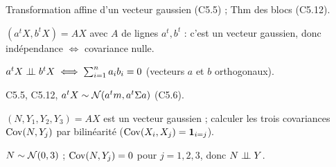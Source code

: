 \documentclass[11pt,a4paper]{article}
\begin{document}
\begin{exo}
\outils Transformation affine d'un vecteur gaussien (C5.5) ; Thm des blocs (C5.12).

\meth $(a^tX,b^tX)=AX$ avec $A$ de lignes $a^t,b^t$ : c'est un vecteur gaussien, donc indépendance $\iff$ covariance nulle.

\rep $a^tX\perp\!\!\!\perp b^tX\iff\sum_{i=1}^na_ib_i=0$ (vecteurs $a$ et $b$ orthogonaux).
\end{exo}

\begin{exo}[$N$ indépendant de $Y$]
\outils C5.5, C5.12, $a^tX\sim\mathcal{N}(a^tm,a^t\Sigma a)$ (C5.6).

\meth $(N,Y_1,Y_2,Y_3)=AX$ est un vecteur gaussien ; calculer les trois covariances $\operatorname{Cov}(N,Y_j)$ par bilinéarité
($\operatorname{Cov}(X_i,X_j)=\mathbf{1}_{i=j}$).

\rep $N\sim\mathcal{N}(0,3)$ ; $\operatorname{Cov}(N,Y_j)=0$ pour $j=1,2,3$, donc $N\perp\!\!\!\perp Y$.
\end{exo}
\end{document}
